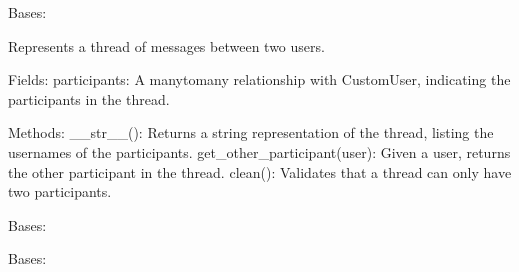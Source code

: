 \documentclass[letterpaper,10pt,english]{sphinxmanual}
\begin{document}
\begin{fulllineitems}
\label{\detokenize{modules/models:interactions.models.Thread}}
\pysigstartsignatures
{}
\pysigstopsignatures
\sphinxAtStartPar
Bases: 

\sphinxAtStartPar
Represents a thread of messages between two users.

\sphinxAtStartPar
Fields:
\sphinxhyphen{} participants: A many\sphinxhyphen{}to\sphinxhyphen{}many relationship with CustomUser, indicating the participants in the thread.

\sphinxAtStartPar
Methods:
\sphinxhyphen{} \_\_str\_\_(): Returns a string representation of the thread, listing the usernames of the participants.
\sphinxhyphen{} get\_other\_participant(user): Given a user, returns the other participant in the thread.
\sphinxhyphen{} clean(): Validates that a thread can only have two participants.

\begin{fulllineitems}
\label{\detokenize{modules/models:interactions.models.Thread.DoesNotExist}}
\pysigstartsignatures
{}
\pysigstopsignatures
\sphinxAtStartPar
Bases: 

\end{fulllineitems}


\begin{fulllineitems}
\label{\detokenize{modules/models:interactions.models.Thread.MultipleObjectsReturned}}
\pysigstartsignatures
{}
\pysigstopsignatures
\sphinxAtStartPar
Bases: 

\end{fulllineitems}



\end{fulllineitems}
\end{document}
